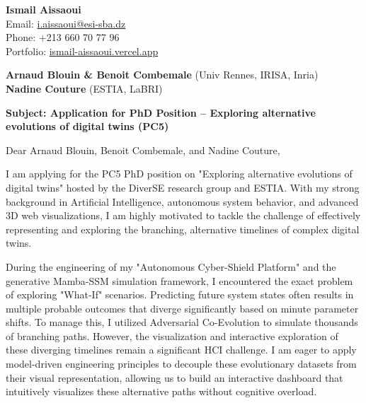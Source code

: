 \documentclass[11pt,a4paper]{article}
\begin{document}
\thispagestyle{empty}

\begin{flushright}
\textbf{Ismail Aissaoui} \\
Email: \href{mailto:i.aissaoui@esi-sba.dz}{i.aissaoui@esi-sba.dz} \\
Phone: +213 660 70 77 96 \\
Portfolio: \href{https://ismail-aissaoui.vercel.app}{ismail-aissaoui.vercel.app}
\end{flushright}

\vspace{1em}

\begin{flushleft}
\textbf{Arnaud Blouin \& Benoit Combemale} (Univ Rennes, IRISA, Inria) \\
\textbf{Nadine Couture} (ESTIA, LaBRI)
\end{flushleft}

\vspace{1em}
\noindent\textbf{Subject: Application for PhD Position -- Exploring alternative evolutions of digital twins (PC5)}
\vspace{1em}

\noindent Dear Arnaud Blouin, Benoit Combemale, and Nadine Couture,

\vspace{1em}
\noindent
I am applying for the PC5 PhD position on "Exploring alternative evolutions of digital twins" hosted by the DiverSE research group and ESTIA. With my strong background in Artificial Intelligence, autonomous system behavior, and advanced 3D web visualizations, I am highly motivated to tackle the challenge of effectively representing and exploring the branching, alternative timelines of complex digital twins.

\vspace{0.5em}
\noindent
During the engineering of my "Autonomous Cyber-Shield Platform" and the generative Mamba-SSM simulation framework, I encountered the exact problem of exploring "What-If" scenarios. Predicting future system states often results in multiple probable outcomes that diverge significantly based on minute parameter shifts. To manage this, I utilized Adversarial Co-Evolution to simulate thousands of branching paths. However, the visualization and interactive exploration of these diverging timelines remain a significant HCI challenge. I am eager to apply model-driven engineering principles to decouple these evolutionary datasets from their visual representation, allowing us to build an interactive dashboard that intuitively visualizes these alternative paths without cognitive overload.
\end{document}

